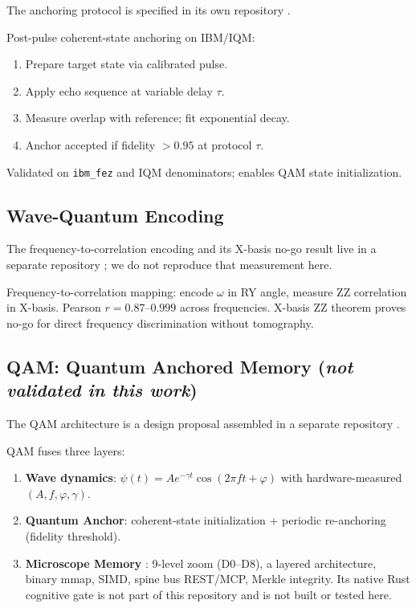 \documentclass[sigconf,anonymous=false]{acmart}
\begin{document}
The anchoring protocol is specified in its own repository \cite{QuantumAnchor}.

Post-pulse coherent-state anchoring on IBM/IQM:
\begin{enumerate}
\item Prepare target state via calibrated pulse.
\item Apply echo sequence at variable delay $\tau$.
\item Measure overlap with reference; fit exponential decay.
\item Anchor accepted if fidelity $> 0.95$ at protocol $\tau$.
\end{enumerate}
Validated on \texttt{ibm\_fez} and IQM denominators; enables QAM state initialization.

\subsection{Wave-Quantum Encoding}

The frequency-to-correlation encoding and its X-basis no-go result live in a separate
repository \cite{WaveQuantum}; we do not reproduce that measurement here.

Frequency-to-correlation mapping: encode $\omega$ in RY angle, measure ZZ correlation in X-basis. Pearson $r = 0.87$--$0.999$ across frequencies. X-basis ZZ theorem proves no-go for direct frequency discrimination without tomography.

\subsection{QAM: Quantum Anchored Memory (\emph{not validated in this work})}
\label{sec:qam}

The QAM architecture is a design proposal assembled in a separate repository \cite{QAM}.
\label{sec:qam}

QAM fuses three layers:
\begin{enumerate}
\item \textbf{Wave dynamics}: $\psi(t) = A e^{-\gamma t} \cos(2\pi f t + \varphi)$ with hardware-measured $(A,f,\varphi,\gamma)$.
\item \textbf{Quantum Anchor}: coherent-state initialization + periodic re-anchoring (fidelity threshold).
\item \textbf{Microscope Memory} \cite{MicroscopeMemory}: 9-level zoom (D0--D8), a layered architecture, binary mmap, SIMD, spine bus REST/MCP, Merkle integrity. Its native Rust cognitive gate is not part of this repository and is not built or tested here.
\end{enumerate}
\end{document}
